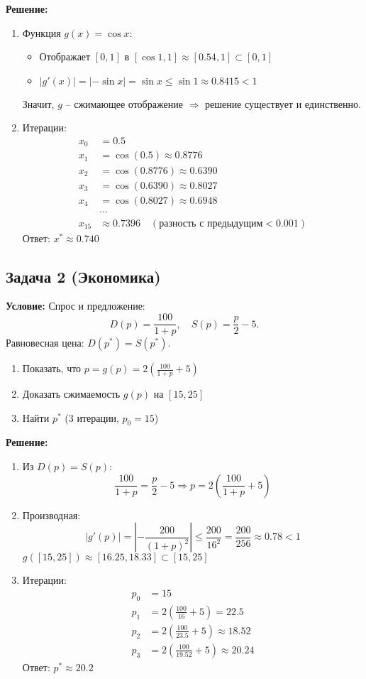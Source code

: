 \documentclass{article}
\begin{document}
\textbf{Решение:}
\begin{enumerate}
\item Функция \(g(x) = \cos x\):
\begin{itemize}
\item Отображает \([0, 1]\) в \([\cos 1, 1] \approx [0.54, 1] \subset [0, 1]\)
\item \(|g'(x)| = |-\sin x| = \sin x \leq \sin 1 \approx 0.8415 < 1\)
\end{itemize}
Значит, \(g\) -- сжимающее отображение \(\Rightarrow\) решение существует и единственно.

\item Итерации:
\begin{align*}
x_0 &= 0.5 \\
x_1 &= \cos(0.5) \approx 0.8776 \\
x_2 &= \cos(0.8776) \approx 0.6390 \\
x_3 &= \cos(0.6390) \approx 0.8027 \\
x_4 &= \cos(0.8027) \approx 0.6948 \\
&\cdots \\
x_{15} &\approx 0.7396 \quad (\text{разность с предыдущим} < 0.001)
\end{align*}
Ответ: \(x^* \approx 0.740\)
\end{enumerate}

\subsection*{Задача 2 (Экономика)}
\textbf{Условие:} Спрос и предложение: 
\[
D(p) = \frac{100}{1 + p}, \quad S(p) = \frac{p}{2} - 5.
\]
Равновесная цена: \(D(p^*) = S(p^*)\).
\begin{enumerate}
\item Показать, что \(p = g(p) = 2\left(\frac{100}{1 + p} + 5\right)\)
\item Доказать сжимаемость \(g(p)\) на \([15, 25]\)
\item Найти \(p^*\) (3 итерации, \(p_0 = 15\))
\end{enumerate}

\textbf{Решение:}
\begin{enumerate}
\item Из \(D(p) = S(p)\):
\[
\frac{100}{1 + p} = \frac{p}{2} - 5 \Rightarrow p = 2\left(\frac{100}{1 + p} + 5\right)
\]

\item Производная:
\[
|g'(p)| = \left| -\frac{200}{(1 + p)^2} \right| \leq \frac{200}{16^2} = \frac{200}{256} \approx 0.78 < 1
\]
\(g([15,25]) \approx [16.25, 18.33] \subset [15,25]\)

\item Итерации:
\begin{align*}
p_0 &= 15 \\
p_1 &= 2\left(\frac{100}{16} + 5\right) = 22.5 \\
p_2 &= 2\left(\frac{100}{23.5} + 5\right) \approx 18.52 \\
p_3 &= 2\left(\frac{100}{19.52} + 5\right) \approx 20.24
\end{align*}
Ответ: \(p^* \approx 20.2\)
\end{enumerate}
\end{document}
